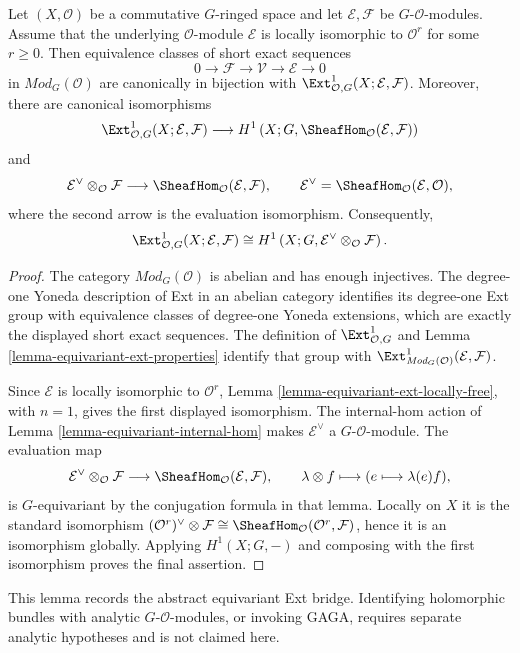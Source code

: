\begin{lemma}
\label{lemma-equivariant-extension-classes-finite-locally-free}
\begin{reference}
\cite[Chapter V, \S 5.6, pp. 218--219]{Tohoku}
\end{reference}
Let $(X,\mathcal O)$ be a commutative $G$-ringed space and let
$\mathcal E,\mathcal F$ be $G$-$\mathcal O$-modules. Assume that the
underlying $\mathcal O$-module $\mathcal E$ is locally isomorphic to
$\mathcal O^r$ for some $r\geq 0$. Then equivalence classes of short exact
sequences
$$
0 \longrightarrow \mathcal F \longrightarrow \mathcal V
\longrightarrow \mathcal E \longrightarrow 0
$$
in $\textit{Mod}_G(\mathcal O)$ are canonically in bijection with
$\Ext^1_{\mathcal O,G}(X;\mathcal E,\mathcal F)$. Moreover, there are
canonical isomorphisms
$$
\Ext^1_{\mathcal O,G}(X;\mathcal E,\mathcal F)
\longrightarrow
H^1\left(X;G,\SheafHom_{\mathcal O}(\mathcal E,\mathcal F)\right)
$$
and
$$
\mathcal E^\vee\otimes_{\mathcal O}\mathcal F
\longrightarrow
\SheafHom_{\mathcal O}(\mathcal E,\mathcal F),
\qquad
\mathcal E^\vee=
\SheafHom_{\mathcal O}(\mathcal E,\mathcal O),
$$
where the second arrow is the evaluation isomorphism. Consequently,
$$
\Ext^1_{\mathcal O,G}(X;\mathcal E,\mathcal F)
\cong
H^1\left(X;G,\mathcal E^\vee\otimes_{\mathcal O}\mathcal F\right).
$$
\end{lemma}

\begin{proof}
The category $\textit{Mod}_G(\mathcal O)$ is abelian and has enough
injectives. The degree-one Yoneda description of Ext in an abelian
category identifies its degree-one Ext group with equivalence classes of
degree-one Yoneda extensions, which are exactly the displayed short exact sequences. The
definition of $\Ext^1_{\mathcal O,G}$ and Lemma
\ref{lemma-equivariant-ext-properties} identify that group with
$\Ext^1_{\textit{Mod}_G(\mathcal O)}(\mathcal E,\mathcal F)$.

\medskip\noindent
Since $\mathcal E$ is locally isomorphic to $\mathcal O^r$, Lemma
\ref{lemma-equivariant-ext-locally-free}, with $n=1$, gives the first
displayed isomorphism. The internal-hom action of Lemma
\ref{lemma-equivariant-internal-hom} makes
$\mathcal E^\vee$ a $G$-$\mathcal O$-module. The evaluation map
$$
\mathcal E^\vee\otimes_{\mathcal O}\mathcal F
\longrightarrow
\SheafHom_{\mathcal O}(\mathcal E,\mathcal F),
\qquad
\lambda\otimes f\longmapsto(e\longmapsto\lambda(e)f),
$$
is $G$-equivariant by the conjugation formula in that lemma. Locally on
$X$ it is the standard isomorphism
$(\mathcal O^r)^\vee\otimes\mathcal F\cong
\SheafHom_{\mathcal O}(\mathcal O^r,\mathcal F)$, hence it is an
isomorphism globally. Applying $H^1(X;G,-)$ and composing with the first
isomorphism proves the final assertion.
\end{proof}

\begin{remark}
This lemma records the abstract equivariant Ext bridge. Identifying
holomorphic bundles with analytic $G$-$\mathcal O$-modules, or invoking
GAGA, requires separate analytic hypotheses and is not claimed here.
\label{remark-equivariant-extension-classes-analytic-boundary}
\end{remark}
